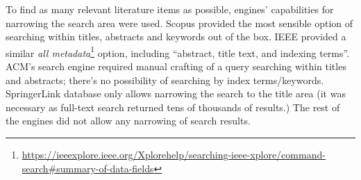 To find as many relevant literature items as possible, engines' capabilities for narrowing the search area were used.
Scopus provided the most sensible option of searching within titles, abstracts and keywords out of the box.
IEEE provided a similar \emph{all metadata}\footnote{\url{https://ieeexplore.ieee.org/Xplorehelp/searching-ieee-xplore/command-search\#summary-of-data-fields}} option, including \enquote{abstract, title text, and indexing terms}.
ACM's search engine required manual crafting of a query searching within titles and abstracts;
there's no possibility of searching by index terms/keywords.
SpringerLink database only allows narrowing the search to the title area (it was necessary as full-text search returned tens of thousands of results.)
The rest of the engines did not allow any narrowing of search results.

